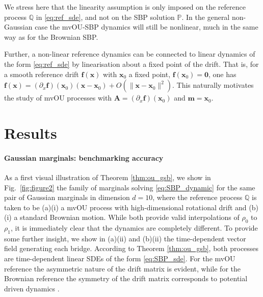 \documentclass{article}
\theoremstyle{newstyle}
\begin{document}
We stress here that the linearity assumption is only imposed on the reference process $\mathbb{Q}$ in \eqref{eq:ref_sde}, and not on the SBP solution $\mathbb{P}$. In the general non-Gaussian case the mvOU-SBP dynamics will still be nonlinear, much in the same way as for the Brownian SBP.

Further, a non-linear reference dynamics can be connected to linear dynamics of the form \eqref{eq:ref_sde} by linearisation about a fixed point of the drift. That is, for a smooth reference drift $\bm{f}(\bm{x})$ with $\bm{x}_0$ a fixed point, $\bm{f}(\bm{x}_0) = \bm{0}$, one has $\bm{f}(\bm{x}) = (\partial_x \bm{f})(\bm{x}_0)(\bm{x} - \bm{x}_0) + O(\| \bm{x} - \bm{x}_0 \|^2 )$. This naturally motivates the study of mvOU processes with $\bm{A} = (\partial_x \bm{f})(\bm{x}_0)$ and $\bm{m} = \bm{x}_0$. 

\section{Results}
\paragraph{Gaussian marginals: benchmarking accuracy}

As a first visual illustration of Theorem \ref{thm:ou_gsb}, we show in Fig.~\ref{fig:figure2} the family of marginals solving \eqref{eq:SBP_dynamic} for the same pair of Gaussian marginals in dimension $d = 10$, where the reference process $\mathbb{Q}$ is taken to be (a)(i) a mvOU process with high-dimensional rotational drift and (b)(i) a standard Brownian motion. While both provide valid interpolations of $\rho_0$ to $\rho_1$, it is immediately clear that the dynamics are completely different. To provide some further insight, we show in (a)(ii) and (b)(ii) the time-dependent vector field generating each bridge. According to Theorem \ref{thm:ou_gsb}, both processes are time-dependent linear SDEs of the form \eqref{eq:SBP_sde}. For the mvOU reference the asymmetric nature of the drift matrix is evident, while for the Brownian reference the symmetry of the drift matrix corresponds to potential driven dynamics \cite{bunne2023schrodinger}.
\end{document}
